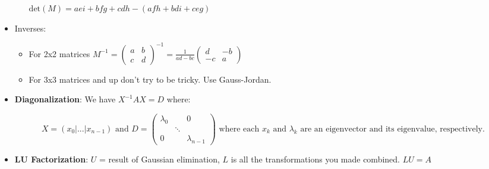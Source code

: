 \documentclass[a4paper]{article}
\begin{document}
\begin{itemize}
\begin{itemize}
                    \(\text{det}(M)= aei+bfg+cdh-(afh+bdi+ceg) \)
            \end{itemize}
        \item Inverses:
            \begin{itemize}
                \item For 2x2 matrices 
                    \(M^{-1} =
                    \begin{pmatrix}
                        a & b \\
                        c & d
                    \end{pmatrix}
                    ^{-1}=
                    \frac{1}{ad-bc}
                    \begin{pmatrix}
                        d & -b \\
                        -c & a
                    \end{pmatrix}
                    \)
                \item For 3x3 matrices and up don't try to be tricky. Use Gauss-Jordan.
            \end{itemize}
        \item \textbf{Diagonalization}: We have \(X^{-1}AX=D\) where:
        
        \[X= (x_0 | \text{...} | x_{n-1}) \text{ and } D =
        \begin{pmatrix}
            \lambda _0 & & 0 \\
            & \ddots & \\
            0 & & \lambda _{n-1}
        \end{pmatrix}
        \text{ where each } x_k \text{ and }\lambda _k \text{ are an eigenvector and its eigenvalue, respectively.}\]
        \item \textbf{LU Factorization}: \(U\) = result of Gaussian elimination, \(L\) is all the transformations you made combined. \(LU=A\)
        

\end{itemize}
\end{document}
